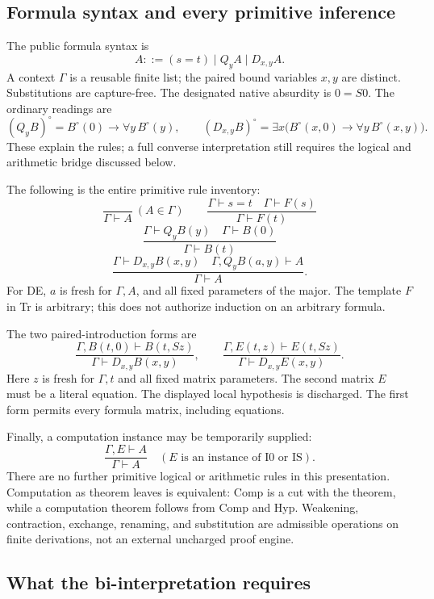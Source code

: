 \documentclass[11pt]{article}
\begin{document}
\subsection{Formula syntax and every primitive inference}

The public formula syntax is
\[
 A::=(s=t)\mid Q_yA\mid D_{x,y}A.
\]
A context $\Gamma$ is a reusable finite list; the paired bound variables
$x,y$ are distinct. Substitutions are capture-free. The designated native
absurdity is $0=S0$. The ordinary
readings are
\[
 (Q_yB)^\circ=B^\circ(0)\to\forall y\,B^\circ(y),\qquad
 (D_{x,y}B)^\circ=\exists x\bigl(B^\circ(x,0)\to
                                      \forall y\,B^\circ(x,y)\bigr).
\]
These explain the rules; a full converse interpretation still requires
the logical and arithmetic bridge discussed below.

The following is the entire primitive rule inventory:
\[
 \frac{}{\Gamma\vdash A}\ (A\in\Gamma)
 \qquad
 \frac{\Gamma\vdash s=t\quad\Gamma\vdash F(s)}
      {\Gamma\vdash F(t)}
 \tag{Hyp, Tr}
\]
\[
 \frac{\Gamma\vdash Q_yB(y)\quad\Gamma\vdash B(0)}
      {\Gamma\vdash B(t)}
 \tag{QE}
\]
\[
 \frac{\Gamma\vdash D_{x,y}B(x,y)\quad
       \Gamma,Q_yB(a,y)\vdash A}
      {\Gamma\vdash A}.
 \tag{DE}
\]
For DE, $a$ is fresh for $\Gamma,A$, and all fixed parameters of the major.
The template $F$ in Tr is arbitrary; this does not authorize induction on
an arbitrary formula.

The two paired-introduction forms are
\[
 \frac{\Gamma,B(t,0)\vdash B(t,Sz)}
      {\Gamma\vdash D_{x,y}B(x,y)},
 \qquad
 \frac{\Gamma,E(t,z)\vdash E(t,Sz)}
      {\Gamma\vdash D_{x,y}E(x,y)}.
 \tag{DI-case, DI-progress}
\]
Here $z$ is fresh for $\Gamma,t$ and all fixed matrix parameters. The
second matrix $E$ must be a literal equation. The displayed local
hypothesis is discharged. The first form permits every formula matrix,
including equations.

Finally, a computation instance may be temporarily supplied:
\[
 \frac{\Gamma,E\vdash A}{\Gamma\vdash A}
 \quad(E\text{ is an instance of I0 or IS}).
 \tag{Comp}
\]
There are no further primitive logical or arithmetic rules in this
presentation. Computation as theorem leaves is equivalent: Comp is a cut
with the theorem, while a computation theorem follows from Comp and Hyp.
Weakening, contraction, exchange, renaming, and substitution are admissible
operations on finite derivations, not an external uncharged proof engine.

\subsection{What the bi-interpretation requires}
\end{document}
